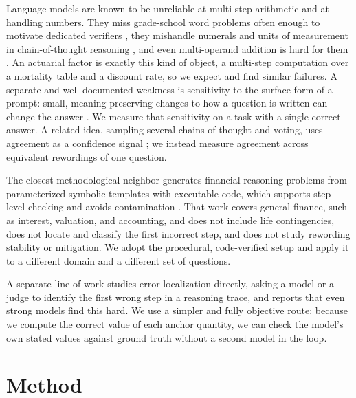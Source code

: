 \documentclass{article}
\begin{document}
Language models are known to be unreliable at multi-step arithmetic and at handling numbers. They miss grade-school word problems often enough to motivate dedicated verifiers \citep{cobbe2021gsm8k}, they mishandle numerals and units of measurement in chain-of-thought reasoning \citep{xu2024numcot}, and even multi-operand addition is hard for them \citep{baeumel2025lookahead}. An actuarial factor is exactly this kind of object, a multi-step computation over a mortality table and a discount rate, so we expect and find similar failures. A separate and well-documented weakness is sensitivity to the surface form of a prompt: small, meaning-preserving changes to how a question is written can change the answer \citep{sclar2024sensitivity}. We measure that sensitivity on a task with a single correct answer. A related idea, sampling several chains of thought and voting, uses agreement as a confidence signal \citep{wang2023selfconsistency}; we instead measure agreement across equivalent rewordings of one question.

The closest methodological neighbor generates financial reasoning problems from parameterized symbolic templates with executable code, which supports step-level checking and avoids contamination \citep{finchain2025}. That work covers general finance, such as interest, valuation, and accounting, and does not include life contingencies, does not locate and classify the first incorrect step, and does not study rewording stability or mitigation. We adopt the procedural, code-verified setup and apply it to a different domain and a different set of questions.

A separate line of work studies error localization directly, asking a model or a judge to identify the first wrong step in a reasoning trace, and reports that even strong models find this hard. We use a simpler and fully objective route: because we compute the correct value of each anchor quantity, we can check the model's own stated values against ground truth without a second model in the loop.

\section{Method}
\end{document}
